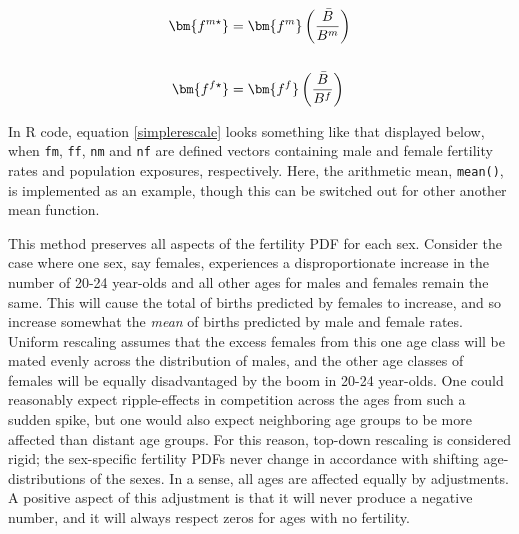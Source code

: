 \begin{align}
\bm{f^{m\star }} &= \bm{f^m} \left(\frac{\bar{B}}{B^m}\right) \notag \\ \notag \\
\bm{f^{f\star }} &= \bm{f^f} \left(\frac{\bar{B}}{B^f}\right)
\label{simplerescale}
\end{align}

In R code, equation \ref{simplerescale} looks something like that displayed below, when \texttt{fm}, \texttt{ff}, \texttt{nm} and \texttt{nf} are defined vectors containing male and female fertility rates and population exposures, respectively. Here, the arithmetic mean, \texttt{mean()}, is implemented as an example, though this can be switched out for other another mean function.



This method preserves all aspects of the fertility PDF for each sex. Consider the case where one sex, say females, experiences a disproportionate increase in the number of 20-24 year-olds and all other ages for males and females remain the same. This will cause the total of births predicted by females to increase, and so increase somewhat the \textit{mean} of births predicted by male and female rates. Uniform rescaling assumes that the excess females from this one age class will be mated evenly across the distribution of males, and the other age classes of females will be equally disadvantaged by the boom in 20-24 year-olds. One could reasonably expect ripple-effects in competition across the ages from such a sudden spike, but one would also expect neighboring age groups to be more affected than distant age groups. For this reason, top-down rescaling is considered rigid; the sex-specific fertility PDFs never change in accordance with shifting age-distributions of the sexes. In a sense, all ages are affected equally by adjustments. A positive aspect of this adjustment is that it will never produce a negative number, and it will always respect zeros for ages with no fertility.

